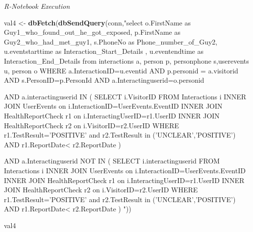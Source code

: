 \documentclass[
]{article}
\newenvironment{Shaded}{\begin{snugshade}}{\end{snugshade}}
\newcommand{\KeywordTok}[1]{\textcolor[rgb]{0.13,0.29,0.53}{\textbf{#1}}}
\newcommand{\NormalTok}[1]{#1}
\newcommand{\StringTok}[1]{\textcolor[rgb]{0.31,0.60,0.02}{#1}}
\begin{document}
\emph{R-Notebook Execution}

\begin{Shaded}
\begin{Highlighting}[]
\NormalTok{val4 <-}\StringTok{ }\KeywordTok{dbFetch}\NormalTok{(}\KeywordTok{dbSendQuery}\NormalTok{(conn,}\StringTok{"select o.FirstName as Guy1_who_found_out_he_got_exposed, p.FirstName as Guy2_who_had_met_guy1, s.PhoneNo as Phone_number_of_Guy2, u.eventstarttime as Interaction_Start_Details , u.eventendtime as Interaction_End_Details from interactions a, person p, personphone s,userevents u, person o}
\StringTok{WHERE a.InteractionID=u.eventid}
\StringTok{AND p.personid = a.visitorid}
\StringTok{AND s.PersonID=p.PersonId}
\StringTok{AND a.Interactinguserid=o.personid}

\StringTok{AND a.interactinguserid IN (}
\StringTok{SELECT  i.VisitorID FROM Interactions i}
\StringTok{INNER JOIN UserEvents on i.InteractionID=UserEvents.EventID}
\StringTok{INNER JOIN HealthReportCheck r1 on i.InteractingUserID=r1.UserID}
\StringTok{INNER JOIN HealthReportCheck r2 on i.VisitorID=r2.UserID}
\StringTok{WHERE r1.TestResult='POSITIVE' and r2.TestResult in ('UNCLEAR','POSITIVE')}
\StringTok{AND  r1.ReportDate< r2.ReportDate}
\StringTok{)}

\StringTok{AND a.Interactinguserid NOT IN (}
\StringTok{SELECT  i.interactinguserid FROM Interactions i}
\StringTok{INNER JOIN UserEvents on i.InteractionID=UserEvents.EventID}
\StringTok{INNER JOIN HealthReportCheck r1 on i.InteractingUserID=r1.UserID}
\StringTok{INNER JOIN HealthReportCheck r2 on i.VisitorID=r2.UserID}
\StringTok{WHERE r1.TestResult='POSITIVE' and r2.TestResult in ('UNCLEAR','POSITIVE')}
\StringTok{AND  r1.ReportDate< r2.ReportDate}
\StringTok{)   "}\NormalTok{))}

\NormalTok{val4}
\end{Highlighting}
\end{Shaded}
\end{document}
